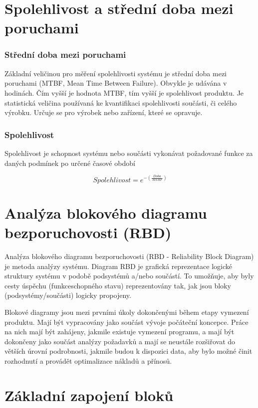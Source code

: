 \documentclass[FM,RP]{tulthesis}
\begin{document}
    \section{Spolehlivost a střední doba mezi poruchami}
        \subsubsection{Střední doba mezi poruchami}
            Základní veličinou pro měření spolehlivosti systému je střední doba mezi poruchami (MTBF, Mean Time
            Between Failure). Obvykle je udávána v hodinách. Čím vyšší je hodnota MTBF, tím vyšší je spolehlivost
            produktu.\cite{3}
            Je statistická veličina používaná ke kvantifikaci spolehlivosti součásti, či celého výrobku.
            Určuje se pro výrobek nebo zařízení, které se opravuje. \cite{3}
        \subsubsection{Spolehlivost}
            Spolehlivost je schopnost systému nebo součásti vykonávat požadované funkce za daných
            podmínek po určené časové období \cite{4} 

            $$ Spolehlivost = e^{-(\frac{Doba}{MTBF})}$$
    
    \section{Analýza blokového diagramu bezporuchovosti (RBD)}

        Analýza blokového diagramu bezporuchovosti (RBD - Reliability Block Diagram) je metoda analýzy systému. 
        Diagram RBD je grafická reprezentace logické struktury systému v podobě podsystémů a/nebo součástí. 
        To umožňuje, aby byly cesty úspěchu (funkceschopného stavu) reprezentovány tak, jak jsou bloky (podsystémy/součásti) logicky propojeny.\cite{1}

        Blokové diagramy jsou mezi prvními úkoly dokončenými během etapy vymezení produktu. 
        Mají být vypracovány jako součást vývoje počáteční koncepce. 
        Práce na nich mají být zahájeny, jakmile existuje vymezení programu, a mají být dokončeny jako součást analýzy požadavků a 
        mají se neustále rozšiřovat do větších úrovní podrobnosti, 
        jakmile budou k dispozici data, aby bylo možné činit rozhodnutí a provádět optimalizace nákladů a přínosů.\cite{2}

    \section{Základní zapojení bloků}
\end{document}
